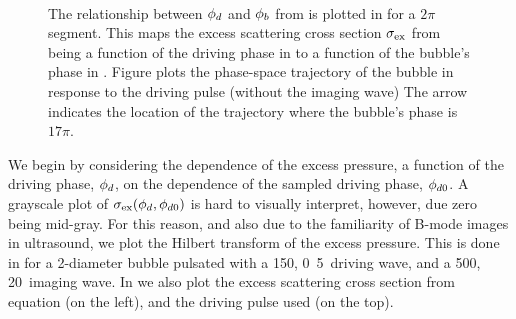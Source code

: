  \begin{figure}[p]
   \centering 
   \\
   \label{fig:FreqRatio}
    \caption{
      The relationship between ${\phi_d}$ and ${\phi_b}$ from  is plotted in \protect{} 
      for a $2\pi$ segment.
      This maps the excess scattering cross section $\sigma_\textrm{ex}$ from being a function of the driving phase in 
      \protect{} to a function of the bubble's phase in 
      \protect{}.
      Figure \protect{} plots the phase-space trajectory of the 
      bubble in response to the driving pulse (without the imaging wave)
      The arrow indicates the location of the trajectory where the bubble's phase is $17\pi$.
   }
   \label{fig:excess_vs_phase:mapping}
 \end{figure}
We begin by considering the dependence of the excess pressure, a function of the driving phase, ${\phi_d}$,
on the dependence of the sampled driving phase, ${\phi_{d0}}$.
%
%
A grayscale plot of $\sigma_\textrm{ex}({\phi_d},{\phi_{d0}})$ is hard to visually interpret, however,
due zero being mid-gray.
For this reason, and also due to the familiarity of B-mode images in ultrasound,
we plot the Hilbert transform of the excess pressure.
This is done in   for a \unit{2}\micro\metre-diameter 
bubble pulsated with a \unit{150}\kilo\pascal, 
\unit{0.5}\mega\hertz\ driving wave, 
and a \unit{500}\kilo\pascal, \unit{20}\mega\hertz\ imaging wave.
In  we also plot the excess scattering cross section from equation  (on the left),
and the driving pulse used (on the top).





